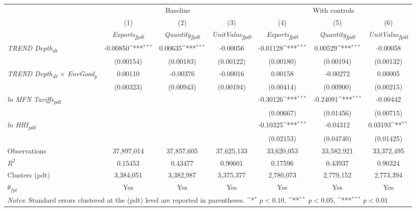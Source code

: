{
\def\sym#1{\ifmmode^{#1}\else\(^{#1}\)\fi}
\begin{tabular}{l*{6}{c}}
\toprule
&\multicolumn{3}{c}{Baseline}&\multicolumn{3}{c}{With controls}\\\cmidrule(lr){2-4}\cmidrule(lr){5-7}
&(1)&(2)&(3)&(4)&(5)&(6)\\
&\textit{Exports\textsubscript{fpdt}}&\textit{Quantity\textsubscript{fpdt}}&\textit{UnitValue\textsubscript{fpdt}}&\textit{Exports\textsubscript{fpdt}}&\textit{Quantity\textsubscript{fpdt}}&\textit{UnitValue\textsubscript{fpdt}}\\
\midrule
\textit{TREND Depth\textsubscript{dt}} & -0.00850\sym{***} & 0.00635\sym{***} & -0.00056 & -0.01128\sym{***} & 0.00529\sym{***} & -0.00058\\
 & (0.00154) & (0.00183) & (0.00122) & (0.00180) & (0.00194) & (0.00132)\\
\addlinespace
\textit{TREND Depth\textsubscript{dt} $\times$ EnvGood\textsubscript{p}} & 0.00110 & -0.00376 & -0.00016 & 0.00158 & -0.00272 & 0.00005\\
 & (0.00323) & (0.00943) & (0.00194) & (0.00414) & (0.00900) & (0.00215)\\
\addlinespace
\textit{ln MFN Tariffs\textsubscript{pdt}} &  &  &  & -0.30126\sym{***} & -0.24091\sym{***} & -0.00442\\
 &  &  &  & (0.00667) & (0.01456) & (0.00715)\\
\addlinespace
\textit{ln HHI\textsubscript{pdt}} &  &  &  & -0.10325\sym{***} & -0.04312 & 0.03193\sym{**}\\
 &  &  &  & (0.02153) & (0.04740) & (0.01425)\\
\midrule
Observations & 37,897,014 & 37,857,605 & 37,625,133 & 33,620,053 & 33,582,921 & 33,372,495\\
$R^{2}$ & 0.15453 & 0.43477 & 0.90601 & 0.17596 & 0.43937 & 0.90324\\
Clusters (pdt) & 3,384,051 & 3,382,987 & 3,375,377 & 2,780,073 & 2,779,152 & 2,773,394\\
$\theta_{fpt}$ & Yes & Yes & Yes & Yes & Yes & Yes\\
\bottomrule
\multicolumn{7}{l}{\footnotesize \textit{Notes}: Standard errors clustered at the (pdt) level are reported in parentheses. \sym{*} \(p<0.10\), \sym{**} \(p<0.05\), \sym{***} \(p<0.01\)}\\
\end{tabular}
}
